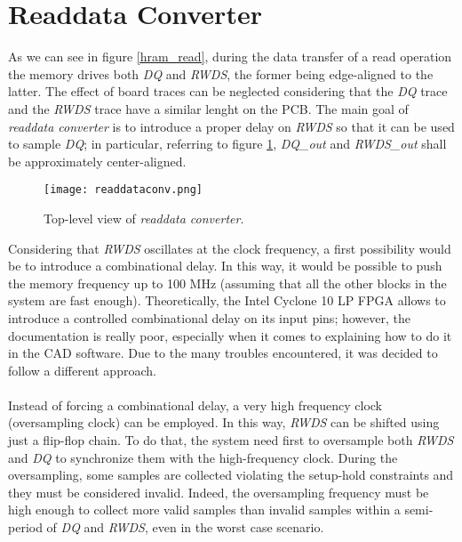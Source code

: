 \documentclass[10pt, english, a4paper, titlepage, oneside]{book}
\begin{document}
\section{Readdata Converter} \label{Readdata Converter}
\vspace{2mm}
As we can see in figure \ref{hram_read}, during the data transfer of a read operation the memory drives both \textit{DQ} and \textit{RWDS}, the former being edge-aligned to the latter. The effect of board traces can be neglected considering that the \textit{DQ} trace and the \textit{RWDS} trace have a similar lenght on the PCB. The main goal of \textit{readdata converter} is to introduce a proper delay on \textit{RWDS} so that it can be used to sample \textit{DQ}; in particular, referring to figure \ref{readdataconv}, \textit{DQ\_out} and \textit{RWDS\_out} shall be approximately center-aligned.
\vspace{6mm}
\begin{figure}[H]
    \centering
    \captionsetup{width=12cm}
    \texttt{[image: readdataconv.png]}
    \vspace{2mm}
    \caption{\centering Top-level view of \textit{readdata converter}.}
    \label{readdataconv}
\end{figure}
\vspace{4mm}
\noindent Considering that \textit{RWDS} oscillates at the clock frequency, a first possibility would be to introduce a combinational delay. In this way, it would be possible to push the memory frequency up to 100 MHz (assuming that all the other blocks in the system are fast enough). Theoretically, the Intel Cyclone 10 LP FPGA allows to introduce a controlled combinational delay on its input pins; however, the documentation is really poor, especially when it comes to explaining how to do it in the CAD software. Due to the many troubles encountered, it was decided to follow a different approach. \\ \\
Instead of forcing a combinational delay, a very high frequency clock (oversampling clock) can be employed. In this way, \textit{RWDS} can be shifted using just a flip-flop chain. To do that, the system need first to oversample both \textit{RWDS} and \textit{DQ} to synchronize them with the high-frequency clock. During the oversampling, some samples are collected violating the setup-hold constraints and they must be considered invalid. Indeed, the oversampling frequency must be high enough to collect more valid samples than invalid samples within a semi-period of \textit{DQ} and \textit{RWDS}, even in the worst case scenario. \\ \\
\end{document}
